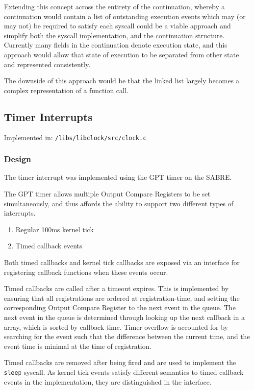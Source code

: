 \documentclass[a4paper,12pt]{article}
\begin{document}
Extending this concept across the entirety of the continuation, whereby a
continuation would contain a list of outstanding execution events which may
(or may not) be required to satisfy each syscall could be a viable approach
and simplify both the syscall implementation, and the continuation structure.
Currently many fields in the continuation denote execution state, and this
approach would allow that state of execution to be separated from other state
and represented consistently.

The downside of this approach would be that the linked list largely becomes a
complex representation of a function call.

\subsection{Timer Interrupts}
Implemented in: \texttt{/libs/libclock/src/clock.c}

\subsubsection{Design}
The timer interrupt was implemented using the GPT timer on the SABRE.

The GPT timer allows multiple Output Compare Registers to be set
simultaneously, and thus affords the ability to support two different types of
interrupts.

\begin{enumerate}
\item Regular 100ms kernel tick
\item Timed callback events
\end{enumerate}

Both timed callbacks and kernel tick callbacks are exposed via an interface
for registering callback functions when these events occur.

Timed callbacks are called after a timeout expires.  This is implemented by
ensuring that all registrations are ordered at registration-time, and setting
the corresponding Output Compare Register to the next event in the queue.  The
next event in the queue is determined through looking up the next callback in
a array, which is sorted by callback time.  Timer overflow is accounted for by
searching for the event such that the difference between the current time, and
the event time is minimal at the time of registration.

Timed callbacks are removed after being fired and are used to implement the
\texttt{sleep} syscall.  As kernel tick events satisfy different semantics to
timed callback events in the implementation, they are distinguished in the
interface.
\end{document}

